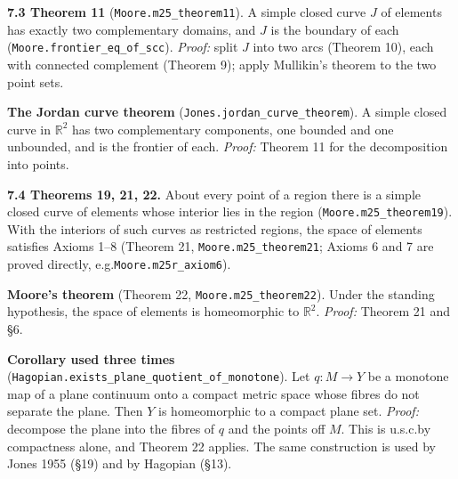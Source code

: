 \documentclass[11pt]{article}
\newcommand{\lean}[1]{\texttt{#1}}
\begin{document}
\textbf{7.3 Theorem 11} (\lean{Moore.\hspace{0pt}m25\_\hspace{0pt}theorem11}). A simple closed curve $J$ of elements has exactly two complementary domains, and $J$ is the boundary of each (\lean{Moore.\hspace{0pt}frontier\_\hspace{0pt}eq\_\hspace{0pt}of\_\hspace{0pt}scc}). \emph{Proof:} split $J$ into two arcs (Theorem 10), each with connected complement (Theorem 9); apply Mullikin's theorem to the two point sets.

\textbf{The Jordan curve theorem} (\lean{Jones.\hspace{0pt}jordan\_\hspace{0pt}curve\_\hspace{0pt}theorem}). A simple closed curve in $\mathbb{R}^2$ has two complementary components, one bounded and one unbounded, and is the frontier of each. \emph{Proof:} Theorem 11 for the decomposition into points.

\textbf{7.4 Theorems 19, 21, 22.} About every point of a region there is a simple closed curve of elements whose interior lies in the region (\lean{Moore.\hspace{0pt}m25\_\hspace{0pt}theorem19}). With the interiors of such curves as restricted regions, the space of elements satisfies Axioms 1--8 (Theorem 21, \lean{Moore.\hspace{0pt}m25\_\hspace{0pt}theorem21}; Axioms 6 and 7 are proved directly, e.g.\@ \lean{Moore.\hspace{0pt}m25r\_\hspace{0pt}axiom6}).

\textbf{Moore's theorem} (Theorem 22, \lean{Moore.\hspace{0pt}m25\_\hspace{0pt}theorem22}). Under the standing hypothesis, the space of elements is homeomorphic to $\mathbb{R}^2$. \emph{Proof:} Theorem 21 and \S{}6.

\textbf{Corollary used three times} (\lean{Hagopian.\hspace{0pt}exists\_\hspace{0pt}plane\_\hspace{0pt}quotient\_\hspace{0pt}of\_\hspace{0pt}monotone}). Let $q : M \to Y$ be a monotone map of a plane continuum onto a compact metric space whose fibres do not separate the plane. Then $Y$ is homeomorphic to a compact plane set. \emph{Proof:} decompose the plane into the fibres of $q$ and the points off $M$. This is u.s.c.\@ by compactness alone, and Theorem 22 applies. The same construction is used by Jones 1955 (\S{}19) and by Hagopian (\S{}13).
\end{document}
